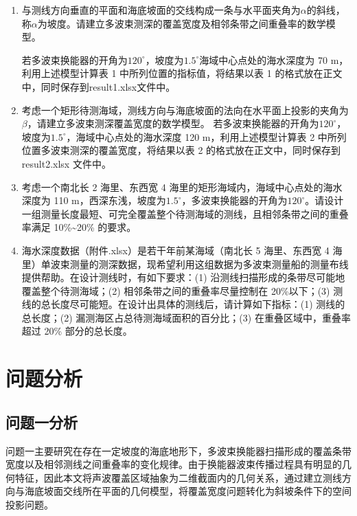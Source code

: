 \documentclass[UTF-8,a4paper,zihao=-4]{ctexart}
\begin{document}
\begin{enumerate}

    \item 与测线方向垂直的平面和海底坡面的交线构成一条与水平面夹角为$\alpha$的斜线，称$\alpha$为坡度。请建立多波束测深的覆盖宽度及相邻条带之间重叠率的数学模型。

    若多波束换能器的开角为$120^\circ$，坡度为$1.5^\circ$海域中心点处的海水深度为 70 m，利用上述模型计算表 1 中所列位置的指标值，将结果以表 1 的格式放在正文中，同时保存到result1.xlsx文件中。

    \item 考虑一个矩形待测海域，测线方向与海底坡面的法向在水平面上投影的夹角为$\beta$，请建立多波束测深覆盖宽度的数学模型。 
    若多波束换能器的开角为$120^\circ$，坡度为$1.5^\circ$，海域中心点处的海水深度 120 m，利用上述模型计算表 2 中所列位置多波束测深的覆盖宽度，将结果以表 2 的格式放在正文中，同时保存到result2.xlsx 文件中。 

    \item 考虑一个南北长 2 海里、东西宽 4 海里的矩形海域内，海域中心点处的海水深度为 110 m，西深东浅，坡度为$1.5^\circ$，多波束换能器的开角为$120^\circ$。请设计一组测量长度最短、可完全覆盖整个待测海域的测线，且相邻条带之间的重叠率满足 10\%\textasciitilde20\% 的要求。 

    \item 海水深度数据（附件.xlsx）是若干年前某海域（南北长 5 海里、东西宽 4 海里）单波束测量的测深数据，现希望利用这组数据为多波束测量船的测量布线提供帮助。在设计测线时，有如下要求：(1) 沿测线扫描形成的条带尽可能地覆盖整个待测海域；(2) 相邻条带之间的重叠率尽量控制在 20\%以下；(3) 测线的总长度尽可能短。在设计出具体的测线后，请计算如下指标：(1) 测线的总长度；(2) 漏测海区占总待测海域面积的百分比；(3) 在重叠区域中，重叠率超过 20\% 部分的总长度。

\end{enumerate}

\section{问题分析}
\subsection{问题一分析}
问题一主要研究在存在一定坡度的海底地形下，多波束换能器扫描形成的覆盖条带宽度以及相邻测线之间重叠率的变化规律。由于换能器波束传播过程具有明显的几何特征，因此本文将声波覆盖区域抽象为二维截面内的几何关系，通过建立测线方向与海底坡面交线所在平面的几何模型，将覆盖宽度问题转化为斜坡条件下的空间投影问题。
\end{document}
